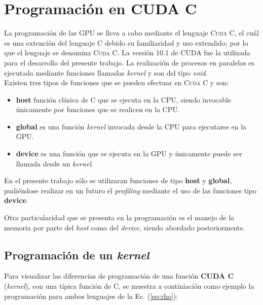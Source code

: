 \section{Programación en CUDA C}

La programación de las GPU se lleva a cabo mediante el lenguaje \textsc{Cuda C}, el cuál es una extención del lenguaje \textsc{C} debido su familiaridad y uso extendido; por lo que el lenguaje se denomina \textsc{Cuda C}. La versión 10.1 de CUDA fue la utilizada para el desarrollo del presente trabajo. La realización de procesos en paralelos es ejecutada mediante funciones llamadas \textit{kernel} y son del tipo \textit{void}.
\\

Existen tres tipos de funciones que se pueden efectuar en \textsc{Cuda C} y son:

\begin{itemize}
	
	\item \textbf{host} función clásica de C que se ejecuta en la CPU, siendo invocable únicamente por funciones que se realicen en la CPU. 

	\item \textbf{global} es una función \textit{kernel} invocada desde la CPU para ejecutarse en la GPU. 
	
	\item \textbf{device} es una función que se ejecuta en la GPU y únicamente puede ser llamada desde un \textit{kernel}.
	
\end{itemize}

En el presente trabajo sólo se utilizaran funciones de tipo \textbf{host} y \textbf{global}, pudiéndose realizar en un futuro el  \textit{profiling} mediante el uso de las funciones tipo \textbf{device}.

Otra particularidad que se presenta en la programación es el manejo de la memoria por parte del \textit{host} como del \textit{device}, siendo abordado posteriormente.


\subsection{Programación de un \textit{kernel}}

Para visualizar las diferencias de programación de una función \textbf{CUDA C } (\textit{kernel}), con una típica función de \textsc{C}, se muestra a continiación como ejemplo la programación para ambos lenguajes de la Ec. (\ref{eq:rho}): 

